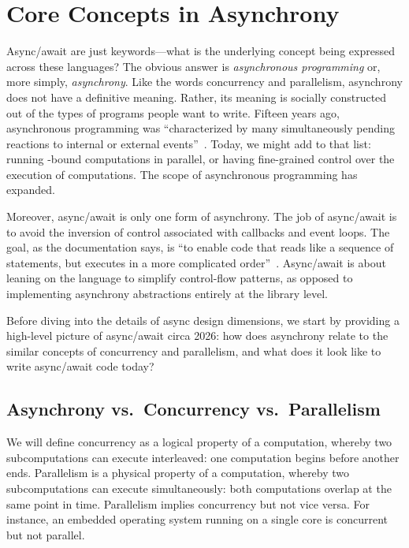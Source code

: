 \section{Core Concepts in Asynchrony}\label{sec:motivation}

Async/await are just keywords---what is the underlying concept being expressed across these languages? The obvious answer is \emph{asynchronous programming} or, more simply, \emph{asynchrony}.
Like the words concurrency and parallelism, asynchrony does not have a definitive meaning. Rather, its meaning is socially constructed out of the types of programs people want to write. Fifteen years ago, asynchronous programming was ``characterized by many simultaneously pending reactions to internal or external events''~\cite{syme2011async}. Today, we might add to that list: running -bound computations in parallel, or having fine-grained control over the execution of computations. The scope of asynchronous programming has expanded.

Moreover, async/await is only one form of asynchrony. The job of async/await is to avoid the inversion of control associated with callbacks and event loops. The goal, as the \CSharp documentation says, is ``to enable code that reads like a sequence of statements, but executes in a more complicated order''~\cite{wagner_asynchronous_2025}. Async/await is about leaning on the language to simplify control-flow patterns, as opposed to implementing asynchrony abstractions entirely at the library level.

Before diving into the details of async design dimensions, we start by providing a high-level picture of async/await circa 2026: how does asynchrony relate to the similar concepts of concurrency and parallelism, and what does it look like to write async/await code today?

\subsection{Asynchrony vs.\ Concurrency vs.\ Parallelism}
\label{s:sync-quotes-from-langs}

We will define concurrency as a logical property of a computation, whereby two subcomputations can execute interleaved: one computation begins before another ends. Parallelism is a physical property of a computation, whereby two subcomputations can execute simultaneously: both computations overlap at the same point in time. Parallelism implies concurrency but not vice versa. For instance, an embedded operating system running on a single core is concurrent but not parallel.

